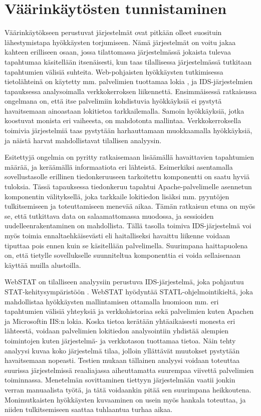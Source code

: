 \section{Väärinkäytösten tunnistaminen}

Väärinkäytökseen perustuvat järjestelmät ovat pitkään olleet suosituin lähestymistapa hyökkäysten torjumiseen. Nämä järjestelmät on voitu jakaa kahteen erilliseen osaan, jossa tilattomassa 
järjestelmässä jokaista tulevaa tapahtumaa käsitellään itsenäisesti, kun taas tilallisessa järjestelmässä tutkitaan tapahtumien välisiä suhteita. Web-pohjaisten hyökkäysten tutkimisessa tietolähteinä 
on käytetty mm. palvelimien tuottamaa lokia \cite{LightTool}, ja IDS-järjestelmien \cite{Snort}\cite{Bro} tapauksessa analysoimalla verkkokerroksen liikennettä. Ensimmäisessä ratkaisussa ongelmana
on, että itse palvelimiin kohdistuvia hyökkäyksiä ei pystytä havaitsemaan ainoastaan lokitietoa tarkkailemalla. Samoin hyökkäyksiä, jotka koostuvat monista eri vaiheesta, on mahdotonta mallintaa. 
Verkkokerroksella toimivia järjestelmiä taas pystytään harhauttamaan muokkaamalla hyökkäyksiä, ja näistä harvat mahdollistavat tilallisen analyysin. 

Esitettyjä ongelmia on pyritty ratkaisemaan lisäämällä havaittavien tapahtumien määrää, ja keräämällä informaatiota eri lähteistä. Esimerkiksi asentamalla sovellustasolle erillinen tiedonkeruuseen 
tarkoitettu komponentti \cite{Application} on saatu hyviä tuloksia. Tässä tapauksessa tiedonkeruu tapahtui Apache-palvelimelle asennetun komponentin välityksellä, joka tarkkaile lokitiedon lisäksi
mm. pyyntöjen tulkitsemiseen ja toteuttamiseen menevää aikaa. Tämän ratkaisun etuna on myös se, että tutkittava data on salaamattomassa muodossa, ja sessioiden uudelleenrakentaminen on mahdollista. 
Tällä tasolla toimiva IDS-järjestelmä voi myös toimia ennaltaehkäisevästi eli haitalliseksi havaittu liikenne voidaan tiputtaa pois ennen kuin se käsitellään palvelimella. Suurimpana haittapuolena on, 
että tietylle sovellukselle suunniteltua komponenttia ei voida sellaisenaan käyttää muilla alustoilla. 

WebSTAT \cite{Webstat} on tilalliseen analyysiin perustuva IDS-järjestelmä, joka pohjautuu STAT-kehitysympäristöön \cite{STAT}. WebSTAT hyödyntää STATL-ohjelmointikieltä, joka mahdollistaa hyökkäysten
mallintamisen ottamalla huomioon mm. eri tapahtumien välisiä yhteyksiä ja verkkohistoriaa sekä palvelimien kuten Apachen ja Microsoftin IIS:n lokia. Koska tietoa kerätään yhtäaikaisesti monesta eri 
lähteestä, voidaan palvelimien lokitiedon analysointiin yhdistää alempien toimintojen kuten jär\-jes\-tel\-mä- ja verkkotason tuottamaa tietoa. Näin tehty analyysi kuvaa koko järjestelmä tilaa, jolloin 
yllättävät muutokset pystytään havaitsemaan nopeasti. Testien mukaan tällainen analyysi voidaan toteuttaa suurissa järjestelmissä reaaliajassa aiheuttamatta suurempaa viivettä palvelimien toiminnassa. 
Menetelmän sovittaminen tiettyyn järjestelmään vaatii jonkin verran manuaalista työtä, ja tätä voidaankin pitää sen suurimpana heikkoutena. Monimutkaisten hyökkäysten kuvaaminen on usein myös hankala
toteuttaa, ja niiden tulkitsemiseen saattaa tuhlaantua turhaa aikaa.

